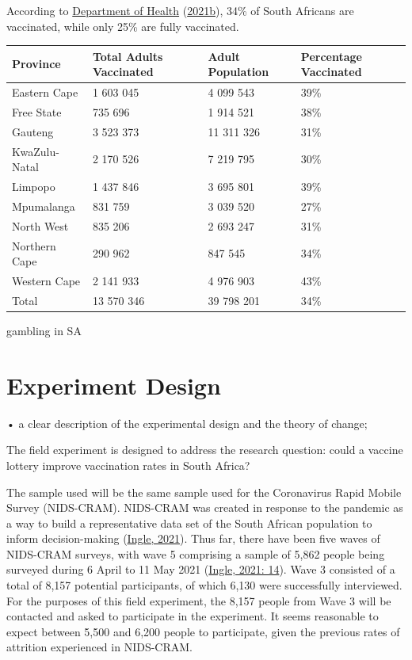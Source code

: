 \documentclass[11pt,preprint, authoryear]{elsarticle}
\let\origtable\table
\let\endorigtable\endtable
\renewenvironment{table}[1][2] {
    \expandafter\origtable\expandafter[H]
} {
    \endorigtable
}
\numberwithin{equation}{section}
\numberwithin{figure}{section}
\numberwithin{table}{section}
\begin{document}
According to \protect\hyperlink{ref-stat}{Department of Health}
(\protect\hyperlink{ref-stat}{2021b}), 34\% of South Africans are
vaccinated, while only 25\% are fully vaccinated.

\begin{table}[H]
\centering
\begin{tabular}{llll}
  \toprule
Province & Total Adults Vaccinated & Adult Population & Percentage Vaccinated \\ 
  \midrule
Eastern Cape & 1 603 045 & 4 099 543 & 39\% \\ 
  Free State & 735 696 & 1 914 521 & 38\% \\ 
  Gauteng & 3 523 373 & 11 311 326 & 31\% \\ 
  KwaZulu-Natal & 2 170 526 & 7 219 795 & 30\% \\ 
  Limpopo & 1 437 846 & 3 695 801 & 39\% \\ 
  Mpumalanga & 831 759 & 3 039 520 & 27\% \\ 
  North West & 835 206 & 2 693 247 & 31\% \\ 
  Northern Cape & 290 962 & 847 545 & 34\% \\ 
  Western Cape & 2 141 933 & 4 976 903 & 43\% \\ 
  Total & 13 570 346 & 39 798 201 & 34\% \\ 
   \bottomrule
\end{tabular}
\caption{Vaccination Statistics \label{tab1}} 
\end{table}

gambling in SA

\hypertarget{experiment-design}{%
\section{\texorpdfstring{Experiment Design
\label{design}}{Experiment Design }}\label{experiment-design}}

• a clear description of the experimental design and the theory of
change;

The field experiment is designed to address the research question: could
a vaccine lottery improve vaccination rates in South Africa?

The sample used will be the same sample used for the Coronavirus Rapid
Mobile Survey (NIDS-CRAM). NIDS-CRAM was created in response to the
pandemic as a way to build a representative data set of the South
African population to inform decision-making
(\protect\hyperlink{ref-nids}{Ingle, 2021}). Thus far, there have been
five waves of NIDS-CRAM surveys, with wave 5 comprising a sample of
5,862 people being surveyed during 6 April to 11 May 2021
(\protect\hyperlink{ref-nids}{Ingle, 2021: 14}). Wave 3 consisted of a
total of 8,157 potential participants, of which 6,130 were successfully
interviewed. For the purposes of this field experiment, the 8,157 people
from Wave 3 will be contacted and asked to participate in the
experiment. It seems reasonable to expect between 5,500 and 6,200 people
to participate, given the previous rates of attrition experienced in
NIDS-CRAM.
\end{document}
